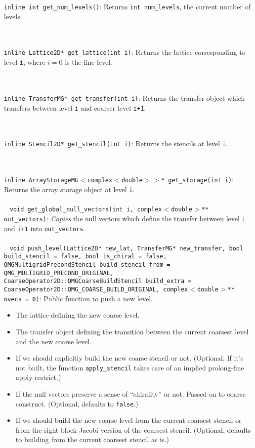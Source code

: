 \documentclass[pdftex,letterpaper,10pt]{article}
\begin{document}
{\texttt{inline int get\_num\_levels()}: Returns {\texttt{int num\_levels}}, the current number of levels.
~\\~\\~
{\texttt{inline Lattice2D* get\_lattice(int i)}: Returns the lattice corresponding to level \texttt{i}, where $i = 0$ is the fine level.
~\\~\\~
{\texttt{inline TransferMG* get\_transfer(int i)}: Returns the transfer object which transfers between level \texttt{i} and coarser level \texttt{i+1}. 
~\\~\\~
{\texttt{inline Stencil2D* get\_stencil(int i)}: Returns the stencils at level \texttt{i}.
~\\~\\~
{\texttt{inline ArrayStorageMG$<$complex$<$double$>>$* get\_storage(int i)}: Returns the array storage object at level \texttt{i}.
~\\~\\~
{\texttt{void get\_global\_null\_vectors(int i, complex$<$double$>$** out\_vectors)}: {\emph{Copies}} the null vectors which define the transfer between level \texttt{i} and \texttt{i+1} into \texttt{out\_vectors}}.
~\\~\\~
{\texttt{void push\_level(Lattice2D* new\_lat, TransferMG* new\_transfer, bool build\_stencil = false, bool is\_chiral = false, QMGMultigridPrecondStencil build\_stencil\_from = QMG\_MULTIGRID\_PRECOND\_ORIGINAL, CoarseOperator2D::QMGCoarseBuildStencil build\_extra = CoarseOperator2D::QMG\_COARSE\_BUILD\_ORIGINAL, complex$<$double$>$** nvecs = 0)}}: Public function to push a new level. 
\begin{itemize}
\item The lattice defining the new coarse level.
\item The transfer object defining the transition between the current coarsest level and the new coarse level.
\item If we should explicitly build the new coarse stencil or not. (Optional. If it's not built, the function {\texttt{apply\_stencil}} takes care of an implied prolong-fine apply-restrict.)
\item If the null vectors preserve a sense of ``chirality'' or not. Passed on to coarse construct. (Optional, defaults to \texttt{false}.)
\item If we should build the new coarse level from the current coarsest stencil or from the right-block-Jacobi version of the coarsest stencil. (Optional, defaults to building from the current coarsest stencil as is.)

\end{itemize}}}}}}
\end{document}
